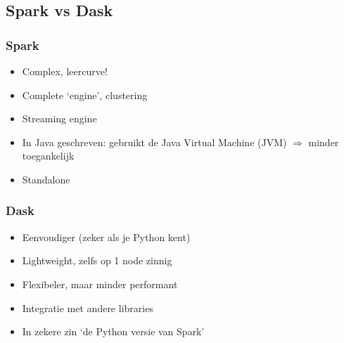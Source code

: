 \documentclass{article}
\begin{document}
\subsection{Spark vs Dask}
\subsubsection{Spark}

\begin{itemize}
    \item Complex, leercurve!
    \item Complete `engine', clustering
    \item Streaming engine
    \item In Java geschreven: gebruikt de Java Virtual Machine (JVM) $\Rightarrow$ minder toegankelijk
    \item Standalone
\end{itemize}

\subsubsection{Dask}

\begin{itemize}
    \item Eenvoudiger (zeker als je Python kent)
    \item Lightweight, zelfs op 1 node zinnig
    \item Flexibeler, maar minder performant
    \item Integratie met andere libraries
    \item In zekere zin `de Python versie van Spark'
\end{itemize}
\end{document}

